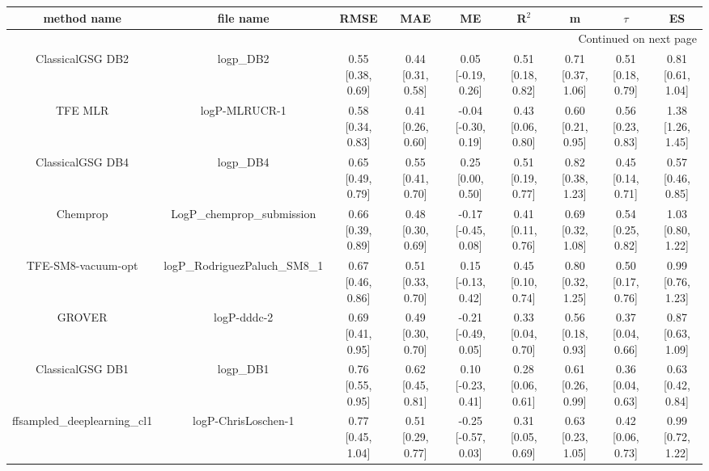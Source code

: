 \documentclass{article}
\begin{document}
\begin{center}
\scriptsize
\begin{longtable}{|ccccccccc|}
\toprule
                  method name &                                      file name &               RMSE &                MAE &                    ME &              R$^2$ &                     m &                $\tau$ &                    ES \\
\midrule
\endhead
\midrule
\multicolumn{9}{r}{{Continued on next page}} \\
\midrule
\endfoot

\bottomrule
\endlastfoot
             ClassicalGSG DB2 &                                      logp\_DB2 &  0.55 [0.38, 0.69] &  0.44 [0.31, 0.58] &    0.05 [-0.19, 0.26] &  0.51 [0.18, 0.82] &     0.71 [0.37, 1.06] &     0.51 [0.18, 0.79] &     0.81 [0.61, 1.04] \\
                      TFE MLR &                                  logP-MLRUCR-1 &  0.58 [0.34, 0.83] &  0.41 [0.26, 0.60] &   -0.04 [-0.30, 0.19] &  0.43 [0.06, 0.80] &     0.60 [0.21, 0.95] &     0.56 [0.23, 0.83] &     1.38 [1.26, 1.45] \\
             ClassicalGSG DB4 &                                      logp\_DB4 &  0.65 [0.49, 0.79] &  0.55 [0.41, 0.70] &     0.25 [0.00, 0.50] &  0.51 [0.19, 0.77] &     0.82 [0.38, 1.23] &     0.45 [0.14, 0.71] &     0.57 [0.46, 0.85] \\
                     Chemprop &                     LogP\_chemprop\_submission &  0.66 [0.39, 0.89] &  0.48 [0.30, 0.69] &   -0.17 [-0.45, 0.08] &  0.41 [0.11, 0.76] &     0.69 [0.32, 1.08] &     0.54 [0.25, 0.82] &     1.03 [0.80, 1.22] \\
           TFE-SM8-vacuum-opt &                  logP\_RodriguezPaluch\_SM8\_1 &  0.67 [0.46, 0.86] &  0.51 [0.33, 0.70] &    0.15 [-0.13, 0.42] &  0.45 [0.10, 0.74] &     0.80 [0.32, 1.25] &     0.50 [0.17, 0.76] &     0.99 [0.76, 1.23] \\
                       GROVER &                                    logP-dddc-2 &  0.69 [0.41, 0.95] &  0.49 [0.30, 0.70] &   -0.21 [-0.49, 0.05] &  0.33 [0.04, 0.70] &     0.56 [0.18, 0.93] &     0.37 [0.04, 0.66] &     0.87 [0.63, 1.09] \\
             ClassicalGSG DB1 &                                      logp\_DB1 &  0.76 [0.55, 0.95] &  0.62 [0.45, 0.81] &    0.10 [-0.23, 0.41] &  0.28 [0.06, 0.61] &     0.61 [0.26, 0.99] &     0.36 [0.04, 0.63] &     0.63 [0.42, 0.84] \\
   ffsampled_deeplearning_cl1 &                            logP-ChrisLoschen-1 &  0.77 [0.45, 1.04] &  0.51 [0.29, 0.77] &   -0.25 [-0.57, 0.03] &  0.31 [0.05, 0.69] &     0.63 [0.23, 1.05] &     0.42 [0.06, 0.73] &     0.99 [0.72, 1.22] \\

\end{longtable}
\end{center}
\end{document}
